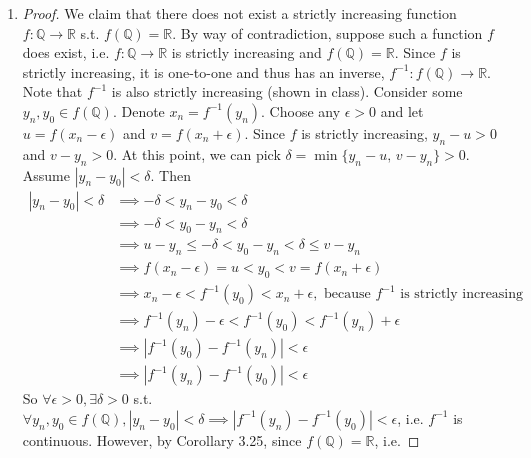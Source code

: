 \documentclass{article}
\begin{document}
\begin{enumerate}
    \item {}
    \begin{proof}
      We claim that there does not exist a 
      strictly increasing function $f:\mathbb{Q}\to\mathbb{R}$ 
      s.t. $f(\mathbb{Q}) = \mathbb{R}$. 
      By way of contradiction, suppose such a 
      function $f$ does exist, i.e. 
      $f: \mathbb{Q}\to\mathbb{R}$ 
      is strictly increasing and $f(\mathbb{Q}) = \mathbb{R}$.
      Since $f$ is strictly increasing, it is one-to-one and thus 
      has an inverse, $f^{-1}: f(\mathbb{Q}) \to \mathbb{R}$. 
      Note that $f^{-1}$ is also strictly increasing (shown in class). 
      Consider some $y_n, y_0 \in f(\mathbb{Q})$. Denote 
      $x_n = f^{-1}(y_n)$. 
      Choose any $\epsilon > 0$ and let 
      $u = f(x_n - \epsilon)$ and 
      $v = f(x_n + \epsilon)$. 
      Since $f$ is strictly increasing, 
      $y_n - u > 0$ and $v - y_n > 0$. 
      At this point, we can pick 
      $\delta = \min\{y_n - u,\,v - y_n\} > 0$. 
      Assume $|y_n - y_0| < \delta$. 
      Then \begin{align*}
        |y_n - y_0| < \delta &\implies -\delta < y_n - y_0 < \delta\\
        &\implies -\delta < y_0 - y_n < \delta\\
        &\implies u - y_n \leq -\delta < y_0 - y_n < \delta \leq v - y_n\\
        &\implies f(x_n - \epsilon) = u < y_0 < v = f(x_n + \epsilon)\\
        &\implies x_n - \epsilon < f^{-1}(y_0) < x_n + \epsilon,\text{ because $f^{-1}$ is strictly increasing}\\
        &\implies f^{-1}(y_n) - \epsilon < f^{-1}(y_0) < f^{-1}(y_n) + \epsilon\\
        &\implies |f^{-1}(y_0) - f^{-1}(y_n)| < \epsilon\\
        &\implies |f^{-1}(y_n) - f^{-1}(y_0)| < \epsilon
      \end{align*}
      So $\forall \epsilon > 0, \exists \delta > 0$ s.t. 
      $\forall y_n, y_0 \in f(\mathbb{Q}), |y_n - y_0| < \delta
      \implies |f^{-1}(y_n) - f^{-1}(y_0)| < \epsilon$, i.e. 
      $f^{-1}$ is continuous. 
      However, by Corollary 3.25, 
      since $f(\mathbb{Q}) = \mathbb{R}$, i.e. 

\end{proof}
\end{enumerate}
\end{document}
